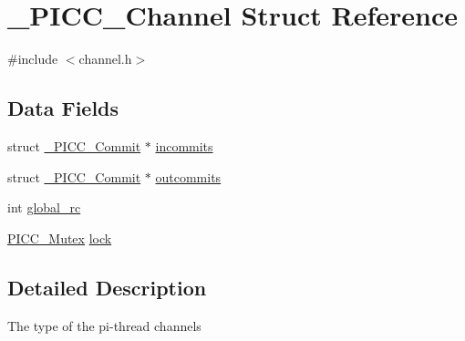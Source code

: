 \hypertarget{struct__PICC__Channel}{\section{\-\_\-\-P\-I\-C\-C\-\_\-\-Channel Struct Reference}
\label{struct__PICC__Channel}
}


{\ttfamily \#include $<$channel.\-h$>$}

\subsection*{Data Fields}
{\bf }\par
\begin{DoxyCompactItemize}
\item 
struct \hyperlink{struct__PICC__Commit}{\-\_\-\-P\-I\-C\-C\-\_\-\-Commit} $\ast$ \hyperlink{struct__PICC__Channel_a7dbd850bbc98db0da80c381652d62f68}{incommits}
\item 
struct \hyperlink{struct__PICC__Commit}{\-\_\-\-P\-I\-C\-C\-\_\-\-Commit} $\ast$ \hyperlink{struct__PICC__Channel_a75755c8cce2c82d51eac3ac9749f0418}{outcommits}
\item 
int \hyperlink{struct__PICC__Channel_a2a19db7029a1bf3b7d28e74bac691b09}{global\-\_\-rc}
\item 
\hyperlink{sync_8h_a600a20a1dd394c06182a81d72e3357f4}{P\-I\-C\-C\-\_\-\-Mutex} \hyperlink{struct__PICC__Channel_a3d02581ff833cb6224c88d4657fb2c50}{lock}
\end{DoxyCompactItemize}



\subsection{Detailed Description}
The type of the pi-\/thread channels 

